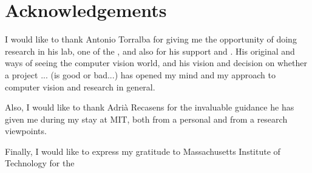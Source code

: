 \chapter*{Acknowledgements}
I would like to thank Antonio Torralba for giving me the opportunity of doing research in his lab, one of the , and also for his support and . His original and ways of seeing the computer vision world, and his vision and decision on whether a project ... (is good or bad...)  has opened my mind and my approach to computer vision and research in general.

Also, I would like to thank Adrià Recasens for the invaluable guidance he has given me during my stay at MIT, both from a personal and from a research viewpoints. 

Finally, I would like to express my gratitude to Massachusetts Institute of Technology for the 

